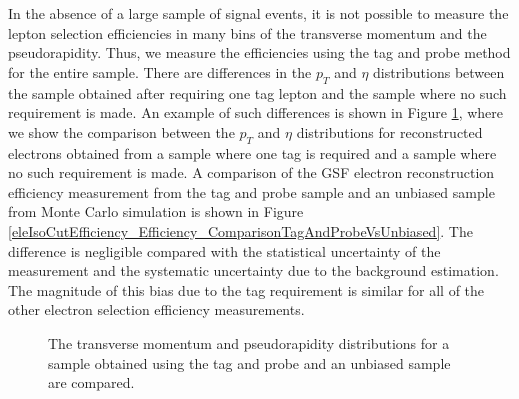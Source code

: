 \documentclass{cmspaper}
\begin{document}
In the absence of a large sample of signal events, it is not possible to measure the lepton selection efficiencies in many bins of the transverse momentum and the pseudorapidity. Thus, we measure the efficiencies using the tag and probe method for the entire sample. There are differences in the $p_{T}$ and $\eta$ distributions between the sample obtained after requiring one tag lepton and the sample where no such requirement is made. An example of such differences is shown in Figure \ref{eleIsoCutEfficiency_Denominator_ComparisonTagAndProbeVsUnbiased}, where we show the comparison between the $p_{T}$ and $\eta$ distributions for reconstructed electrons obtained from a sample where one tag is required and a sample where no such requirement is made. A comparison of the GSF electron reconstruction efficiency measurement from the tag and probe sample and an unbiased \Z\To\Ep\Em sample from Monte Carlo simulation is shown in Figure \ref{eleIsoCutEfficiency_Efficiency_ComparisonTagAndProbeVsUnbiased}. The difference is negligible compared with the statistical uncertainty of the measurement and the systematic uncertainty due to the background estimation. The magnitude of this bias due to the tag requirement is similar for all of the other electron selection efficiency measurements.

\begin{figure}[htb]
  \begin{center}
    \caption{The transverse momentum and pseudorapidity distributions for a sample obtained using the tag and probe and an unbiased \Z\To\Ep\Em sample are compared.}
    \label{eleIsoCutEfficiency_Denominator_ComparisonTagAndProbeVsUnbiased}
  \end{center}
\end{figure}
\end{document}
